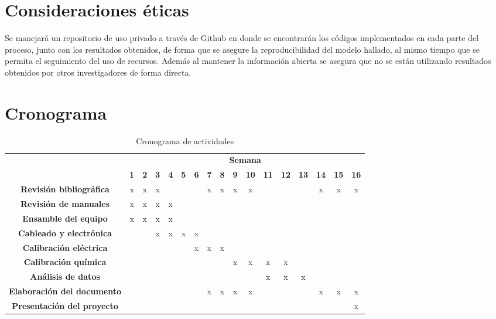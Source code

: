 \section{Consideraciones éticas}
	Se manejará un repositorio de uso privado a través de Github en donde se encontrar\'an los códigos implementados en cada parte del proceso, junto con los resultados obtenidos, de forma que se asegure la reproducibilidad del modelo hallado, al mismo tiempo que se permita el seguimiento del uso de recursos. Adem\'as al mantener la informaci\'on abierta se asegura que no se están utilizando resultados obtenidos por otros investigadores de forma directa.
	
\section{Cronograma}
	\begin{table}[h]
		\centering
		\caption{Cronograma de actividades}
		\label{tb: cronograma}
		\footnotesize
		\begin{tabular}{|c|c|c|c|c|c|c|c|c|c|c|c|c|c|c|c|c|}
			\hline
			\rowcolor[HTML]{C0C0C0} 
			\cellcolor[HTML]{C0C0C0}                                       & \multicolumn{16}{c|}{\cellcolor[HTML]{C0C0C0}\textbf{Semana}} \\ \cline{2-17} 
			\rowcolor[HTML]{EFEFEF} 
			\multirow{-2}{*}{\cellcolor[HTML]{C0C0C0}\textbf{Actividades}} & \textbf{1} & \textbf{2} & \textbf{3} & \textbf{4} & \textbf{5} & \textbf{6} & \textbf{7} & \textbf{8} & \textbf{9} & \textbf{10} & \textbf{11} & \textbf{12} & \textbf{13} & \textbf{14} & \textbf{15} & \textbf{16} \\ \hline
			\cellcolor[HTML]{EFEFEF}
			\textbf{Revisión bibliográfica} & x & x & x & & & & x & x & x & x & & & & x & x & x \\ \hline
			\cellcolor[HTML]{EFEFEF}\textbf{Revisión de manuales} & x & x & x & x & & & & & & & & & & & & \\ \hline
			\cellcolor[HTML]{EFEFEF}\textbf{Ensamble del equipo} & x & x & x & x & & & & & & & & & & & & \\ \hline
			\cellcolor[HTML]{EFEFEF}\textbf{Cableado y electrónica} & & & x & x & x & x & & & & & & & & & & \\ \hline
			\cellcolor[HTML]{EFEFEF}\textbf{Calibración eléctrica} & & & & & & x & x & x & & & & & & & & \\ \hline
			\cellcolor[HTML]{EFEFEF}\textbf{Calibración química} & & & & & & & & & x & x & x & x & & & & \\ \hline
			\cellcolor[HTML]{EFEFEF}\textbf{Análisis de datos} & & & & & & & & & & & x & x & x & & & \\ \hline
			\cellcolor[HTML]{EFEFEF}\textbf{Elaboración del documento} & & & & & & & x & x & x & x & & & & x & x & x \\ \hline
			\cellcolor[HTML]{EFEFEF}\textbf{Presentación del proyecto} & & & & & & & & & & & & & & & & x \\ \hline
		\end{tabular}
	\end{table}